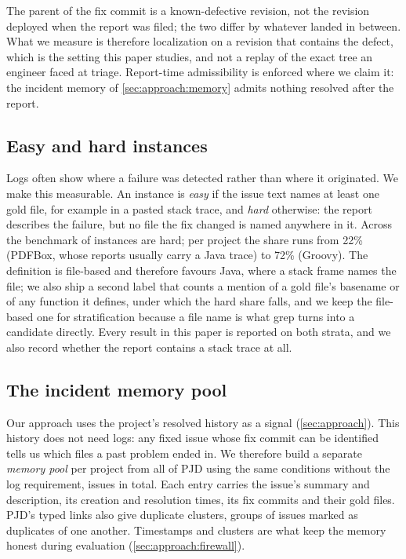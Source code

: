 The parent of the fix commit is a known-defective revision, not the
revision deployed when the report was filed; the two differ by whatever
landed in between. What we measure is therefore localization on a
revision that contains the defect, which is the setting this paper
studies, and not a replay of the exact tree an engineer faced at
triage. Report-time admissibility is enforced where we claim it: the
incident memory of \cref{sec:approach:memory} admits nothing resolved
after the report.

\subsection{Easy and hard instances}
\label{sec:benchmark:strata}

Logs often show where a failure was detected rather than where it
originated. We make this measurable. An instance
is \emph{easy} if the issue text names at least one gold file, for
example in a pasted stack trace, and \emph{hard} otherwise: the report
describes the failure, but no file the fix changed is named anywhere in
it. Across the benchmark \nHardPct{} of instances are hard; per project
the share runs from 22\% (PDFBox, whose reports usually carry a Java
trace) to 72\% (Groovy). The definition is file-based and therefore
favours Java, where a stack frame names the file; we also ship a second
label that counts a mention of a gold file's basename or of any function
it defines, under which the hard share falls, and we keep the file-based
one for stratification because a file name is what grep turns into a
candidate directly. Every result in this paper is reported on both
strata, and we also record whether the report contains a stack trace at
all.

\subsection{The incident memory pool}
\label{sec:benchmark:memory}

Our approach uses the project's resolved history as a signal
(\cref{sec:approach}). This history does not need logs: any fixed issue
whose fix commit can be identified tells us which files a past problem
ended in. We therefore build a separate \emph{memory pool} per project
from all of PJD using the same conditions without the log requirement,
\nMemoryPool{} issues in total. Each entry carries the issue's summary
and description, its creation and resolution times, its fix commits and
their gold files. PJD's typed links also give duplicate clusters,
groups of issues marked as duplicates of one another. Timestamps and
clusters are what keep the memory honest during evaluation
(\cref{sec:approach:firewall}).
